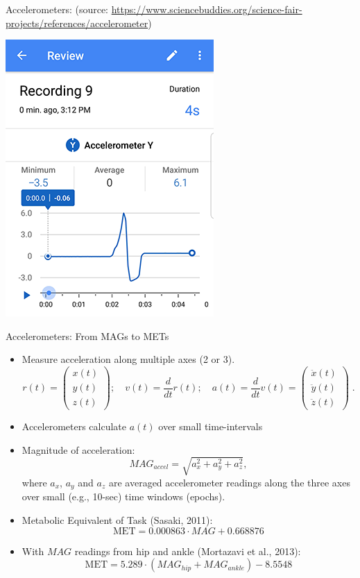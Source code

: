 \documentclass[
10pt]{beamer}
\begin{document}
\begin{frame}{Accelerometers: (source: \url{https://www.sciencebuddies.org/science-fair-projects/references/accelerometer})}

\begin{center}
  \includegraphics[scale=0.5]{figs/accel-technote-figure8-app-screenshot.png}
 \end{center}
 
\end{frame}

\begin{frame}{Accelerometers: From MAGs to METs}

{\small 
\begin{itemize}
 \item Measure acceleration along multiple axes (2 or 3).
 \[
 r(t) =
  \begin{pmatrix}
   x(t) \\ y(t) \\ z(t)
  \end{pmatrix};\quad v(t) = \frac{d}{dt}r(t);\quad a(t) = \frac{d}{dt} v(t) = \begin{pmatrix}
   \ddot{x}(t) \\ \ddot{y}(t) \\ \ddot{z}(t)
  \end{pmatrix}\;.
 \]
 
 \item Accelerometers calculate $a(t)$ over small time-intervals
 
 \item Magnitude of acceleration: $$MAG_{accel} = \sqrt{a_x^2 + a_y^2 + a_z^2},$$ where $a_x$, $a_y$ and $a_z$ are averaged accelerometer readings along the three axes over small (e.g., 10-sec) time windows (epochs).
 
 \item Metabolic Equivalent of Task (Sasaki, 2011):
 \[
  \text{MET} = 0.000863\cdot MAG + 0.668876
 \]

 \item With $MAG$ readings from hip and ankle (Mortazavi et al., 2013):
 \[
  \text{MET} = 5.289\cdot (MAG_{hip} + MAG_{ankle}) - 8.5548
 \]
\end{itemize}
}

\end{frame}
\end{document}
